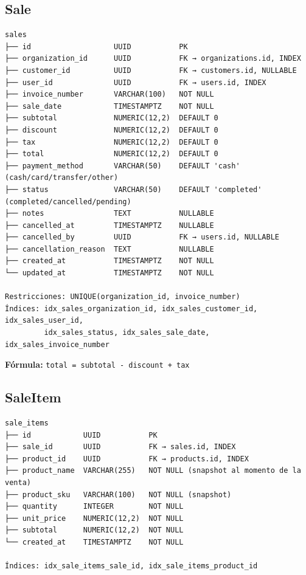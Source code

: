 \subsection{Sale}\label{sale}

\begin{verbatim}
sales
├── id                   UUID           PK
├── organization_id      UUID           FK → organizations.id, INDEX
├── customer_id          UUID           FK → customers.id, NULLABLE
├── user_id              UUID           FK → users.id, INDEX
├── invoice_number       VARCHAR(100)   NOT NULL
├── sale_date            TIMESTAMPTZ    NOT NULL
├── subtotal             NUMERIC(12,2)  DEFAULT 0
├── discount             NUMERIC(12,2)  DEFAULT 0
├── tax                  NUMERIC(12,2)  DEFAULT 0
├── total                NUMERIC(12,2)  DEFAULT 0
├── payment_method       VARCHAR(50)    DEFAULT 'cash' (cash/card/transfer/other)
├── status               VARCHAR(50)    DEFAULT 'completed' (completed/cancelled/pending)
├── notes                TEXT           NULLABLE
├── cancelled_at         TIMESTAMPTZ    NULLABLE
├── cancelled_by         UUID           FK → users.id, NULLABLE
├── cancellation_reason  TEXT           NULLABLE
├── created_at           TIMESTAMPTZ    NOT NULL
└── updated_at           TIMESTAMPTZ    NOT NULL

Restricciones: UNIQUE(organization_id, invoice_number)
Índices: idx_sales_organization_id, idx_sales_customer_id, idx_sales_user_id,
         idx_sales_status, idx_sales_sale_date, idx_sales_invoice_number
\end{verbatim}

\textbf{Fórmula:} \texttt{total\ =\ subtotal\ -\ discount\ +\ tax}

\subsection{SaleItem}\label{saleitem}

\begin{verbatim}
sale_items
├── id            UUID           PK
├── sale_id       UUID           FK → sales.id, INDEX
├── product_id    UUID           FK → products.id, INDEX
├── product_name  VARCHAR(255)   NOT NULL (snapshot al momento de la venta)
├── product_sku   VARCHAR(100)   NOT NULL (snapshot)
├── quantity      INTEGER        NOT NULL
├── unit_price    NUMERIC(12,2)  NOT NULL
├── subtotal      NUMERIC(12,2)  NOT NULL
└── created_at    TIMESTAMPTZ    NOT NULL

Índices: idx_sale_items_sale_id, idx_sale_items_product_id
\end{verbatim}


